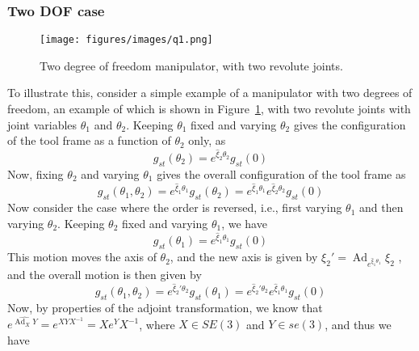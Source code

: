 \newpage
\subsubsection*{Two DOF case}

\begin{figure}[htb]
    \centering
    \texttt{[image: figures/images/q1.png]}
    \caption{
        Two degree of freedom manipulator, with two revolute joints.
    }\label{fig:2dof-manipulator}
\end{figure}

To illustrate this, consider a simple example of a manipulator with two degrees of freedom, an example of which is shown in Figure~\ref{fig:2dof-manipulator}, with two revolute joints with joint variables \( \theta_1 \) and \( \theta_2 \).
Keeping \( \theta_1 \) fixed and varying \( \theta_2 \) gives the configuration of the tool frame as a function of \( \theta_2 \) only, as
\begin{equation*}
    g_{st}(\theta_2)
    =
    e^{\widehat{\xi}_2 \theta_2}
    g_{st}(0)
\end{equation*}
Now, fixing \( \theta_2 \) and varying \( \theta_1 \) gives the overall configuration of the tool frame as
\begin{equation}\label{eq:varying-theta2-first}
    g_{st}(\theta_1, \theta_2)
    =
    e^{\widehat{\xi}_1 \theta_1}
    g_{st}(\theta_2)
    =
    e^{\widehat{\xi}_1 \theta_1}
    e^{\widehat{\xi}_2 \theta_2}
    g_{st}(0)
\end{equation}
Now consider the case where the order is reversed, i.e., first varying \( \theta_1 \) and then varying \( \theta_2 \).
Keeping \( \theta_2 \) fixed and varying \( \theta_1 \), we have
\begin{equation*}
    g_{st}(\theta_1)
    =
    e^{\widehat{\xi}_1 \theta_1}
    g_{st}(0)
\end{equation*}
This motion moves the axis of \( \theta_2 \), and the new axis is given by
\(
\displaystyle
\xi_2'
=
\operatorname{Ad}_{e^{\widehat{\xi}_1 \theta_1}} \xi_2
\)
, and the overall motion is then given by
\begin{equation*}
    g_{st}(\theta_1, \theta_2)
    =
    e^{\widehat{\xi}_2' \theta_2}
    g_{st}(\theta_1)
    =
    e^{\widehat{\xi}_2' \theta_2}
    e^{\widehat{\xi}_1 \theta_1}
    g_{st}(0)
\end{equation*}
Now, by properties of the adjoint transformation, we know that \( e^{\widehat{\operatorname{Ad}_X Y}} = e^{X Y X^{-1}} = X e^{Y} X^{-1} \), where \( X \in SE (3) \) and \( Y \in se (3) \), and thus we have
